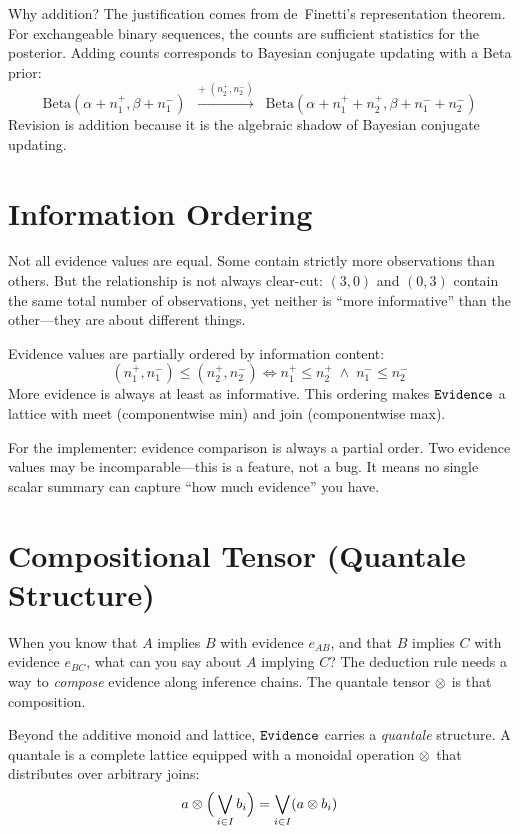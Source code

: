 \documentclass[11pt,openany]{report}
\begin{document}
Why addition?  The justification comes from de~Finetti's
representation theorem.  For exchangeable binary sequences, the counts
are sufficient statistics for the posterior.  Adding counts corresponds to
Bayesian conjugate updating with a Beta prior:
\[
  \text{Beta}(\alpha + n_1^+, \beta + n_1^-)
  \;\;\xrightarrow{+\;(n_2^+, n_2^-)}\;\;
  \text{Beta}(\alpha + n_1^+ + n_2^+, \beta + n_1^- + n_2^-)
\]
Revision is addition because it is the algebraic shadow of Bayesian
conjugate updating.

\section{Information Ordering}

Not all evidence values are equal.  Some contain strictly more
observations than others.  But the relationship is not always clear-cut:
$(3, 0)$ and $(0, 3)$ contain the same total number of observations, yet
neither is ``more informative'' than the other---they are about different
things.

Evidence values are partially ordered by information content:
\[
  (n_1^+, n_1^-) \le (n_2^+, n_2^-) \iff
  n_1^+ \le n_2^+ \;\wedge\; n_1^- \le n_2^-
\]
More evidence is always at least as informative.  This ordering makes
$\mathtt{Evidence}$ a lattice with meet (componentwise min) and join (componentwise
max).

For the implementer: evidence comparison is always a partial order.  Two
evidence values may be incomparable---this is a feature, not a bug.  It
means no single scalar summary can capture ``how much evidence'' you have.

\section{Compositional Tensor (Quantale Structure)}

When you know that $A$ implies $B$ with evidence $e_{AB}$, and that $B$
implies $C$ with evidence $e_{BC}$, what can you say about $A$ implying
$C$?  The deduction rule needs a way to \emph{compose} evidence along
inference chains.  The quantale tensor $\otimes$ is that composition.

Beyond the additive monoid and lattice, $\mathtt{Evidence}$ carries a
\emph{quantale} structure.  A quantale is a complete lattice equipped
with a monoidal operation $\otimes$ that distributes over arbitrary
joins:
\[
  a \otimes \Big(\bigvee_{i \in I} b_i\Big) = \bigvee_{i \in I} (a \otimes b_i)
\]
\end{document}
